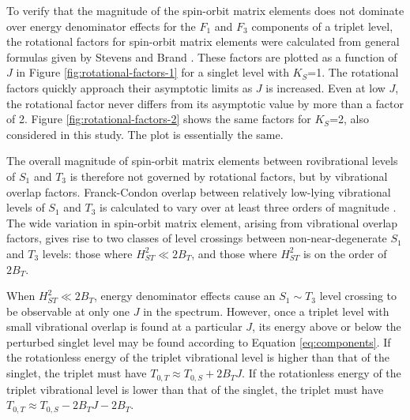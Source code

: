 \documentclass[12pt]{mitthesis}
\begin{document}
To verify that the magnitude of the spin-orbit matrix elements does
not dominate over energy denominator effects for the $F_1$ and $F_3$
components of a triplet level, the rotational factors for spin-orbit
matrix elements were calculated from general formulas given by Stevens
and Brand \cite{stevens73}.  These factors are plotted as a function
of $J$ in Figure \ref{fig:rotational-factors-1} for a singlet level
with $K_S$=1.  The rotational factors quickly approach their
asymptotic limits as $J$ is increased.  Even at low $J$, the
rotational factor never differs from its asymptotic value by more than
a factor of 2.  Figure \ref{fig:rotational-factors-2} shows the same
factors for $K_S$=2, also considered in this study.  The plot is
essentially the same.

The overall magnitude of spin-orbit matrix elements between
rovibrational levels of $S_1$ and $T_3$ is therefore not governed by
rotational factors, but by vibrational overlap factors.  Franck-Condon
overlap between relatively low-lying vibrational levels of $S_1$ and
$T_3$ is calculated to vary over at least three orders of magnitude
\cite{thom07}.  The wide variation in spin-orbit matrix element,
arising from vibrational overlap factors, gives rise to two classes of
level crossings between non-near-degenerate $S_1$ and $T_3$ levels:
those where $H_{ST}^2 \ll 2B_T$, and those where $H_{ST}^2$ is on the
order of $2B_T$.

When $H_{ST}^2 \ll 2B_T$, energy denominator effects cause an $S_1
\sim T_3$ level crossing to be observable at only one $J$ in the
spectrum.  However, once a triplet level with small vibrational
overlap is found at a particular $J$, its energy above or below the
perturbed singlet level may be found according to Equation
\ref{eq:components}.  If the rotationless energy of the triplet
vibrational level is higher than that of the singlet, the triplet must
have $T_{0,T} \approx T_{0,S} + 2B_TJ$.  If the rotationless energy of
the triplet vibrational level is lower than that of the singlet, the
triplet must have $T_{0,T} \approx T_{0,S} - 2B_TJ - 2B_T$.
\end{document}
